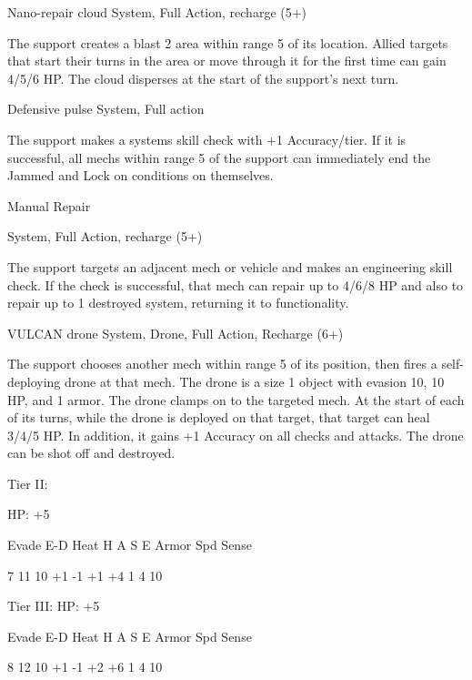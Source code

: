 Nano-repair cloud
System, Full Action, recharge (5+)

The support creates a blast 2 area within range 5 of its location. Allied targets that start their
turns in the area or move through it for the first time can gain 4/5/6 HP. The cloud disperses at
the start of the support’s next turn.


Defensive pulse
System, Full action

The support makes a systems skill check with +1 Accuracy/tier. If it is successful, all mechs
within range 5 of the support can immediately end the Jammed and Lock on conditions on
themselves.


Manual Repair

System, Full Action, recharge (5+)

The support targets an adjacent mech or vehicle and makes an engineering skill check. If the
check is successful, that mech can repair up to 4/6/8 HP and also to repair up to 1 destroyed
system, returning it to functionality.


VULCAN drone
System, Drone, Full Action, Recharge (6+)

The support chooses another mech within range 5 of its position, then fires a self-deploying
drone at that mech. The drone is a size 1 object with evasion 10, 10 HP, and 1 armor. The drone
clamps on to the targeted mech. At the start of each of its turns, while the drone is deployed on
that target, that target can heal 3/4/5 HP. In addition, it gains +1 Accuracy on all checks and
attacks. The drone can be shot off and destroyed.


Tier II:

HP: +5


          Evade    E-D    Heat     H    A     S     E       Armor        Spd      Sense

          7        11     10       +1   -1    +1    +4      1            4        10

Tier III:
HP: +5


          Evade    E-D    Heat     H    A     S     E       Armor        Spd      Sense

          8        12     10       +1   -1    +2    +6      1            4        10

